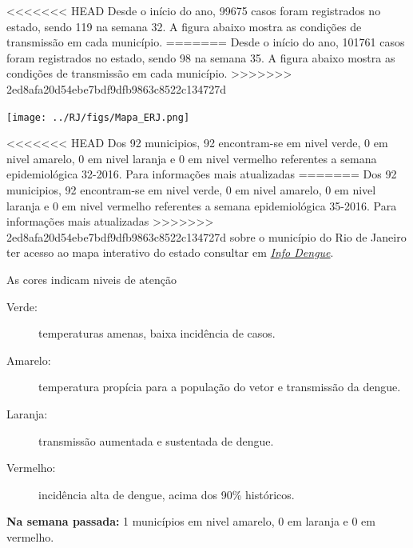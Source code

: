 \documentclass[10pt]{article} %
\begin{document}
\begin{minipage}[t]{.66\linewidth} %

  \hypertarget{estado}{} %

<<<<<<< HEAD
Desde o início do ano, 99675 casos foram registrados no estado, sendo 119 na semana 32. A figura abaixo mostra as condições de transmissão em cada município.
=======
Desde o início do ano, 101761 casos foram registrados no estado, sendo 98 na semana 35. A figura abaixo mostra as condições de transmissão em cada município.
>>>>>>> 2ed8afa20d54ebe7bdf9dfb9863c8522c134727d

\texttt{[image: ../RJ/figs/Mapa\_ERJ.png]}
  
<<<<<<< HEAD
  Dos 92 municipios, 92 encontram-se em nivel verde, 0 em nivel amarelo, 0 em nivel laranja e 0 em nivel vermelho referentes a semana epidemiológica 32-2016. Para informações mais atualizadas
=======
  Dos 92 municipios, 92 encontram-se em nivel verde, 0 em nivel amarelo, 0 em nivel laranja e 0 em nivel vermelho referentes a semana epidemiológica 35-2016. Para informações mais atualizadas
>>>>>>> 2ed8afa20d54ebe7bdf9dfb9863c8522c134727d
sobre o município do Rio de Janeiro ter acesso ao mapa interativo do estado consultar em \href{http://info.dengue.mat.br}{\textit{Info Dengue}}.


  \vspace{1cm}
\begin{mdframed}[style=intextbox,frametitle={}] %

\hypertarget{descriptivebox}{} %
As cores indicam niveis de atenção
\begin{description}
\item[Verde:] temperaturas amenas, baixa incidência de casos.      
\item[Amarelo:] temperatura propícia para a população do vetor e transmissão da dengue.
\item[Laranja:] transmissão aumentada e sustentada de dengue. 
\item[Vermelho:] incidência alta de dengue, acima dos 90\% históricos.
\end{description}
\end{mdframed}

\textbf{Na semana passada:} 1 municípios em nivel amarelo, 0 em laranja e 0 em vermelho.  

\end{minipage} %
\end{document}
